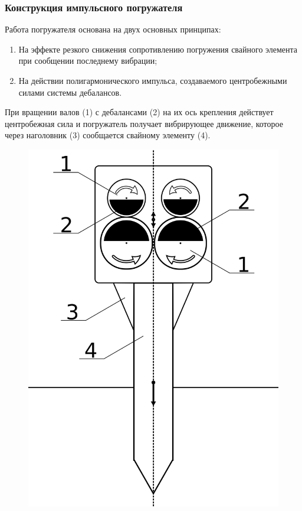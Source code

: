 \documentclass[10pt, pdf, hyperref={unicode}]{beamer}
\begin{document}
    \begin{frame}
        \frametitle{Конструкция импульсного погружателя}
        \begin{center}
            \begin{minipage}[h]{0.97\linewidth}
                \begin{minipage}[h]{0.55\linewidth}
                    Работа погружателя основана на двух основных принципах:
                    \begin{enumerate} 
                        \item На эффекте резкого снижения сопротивлению погружения свайного элемента при сообщении последнему вибрации;
                        \item На действии полигармонического импульса, создаваемого центробежными силами системы дебалансов.
                    \end{enumerate}
                    При вращении валов (1) с дебалансами (2) на их ось крепления действует центробежная сила и погружатель получает вибрирующее движение,
                    которое через наголовник (3) сообщается свайному элементу (4).
                \end{minipage}
                \hfill
                \begin{minipage}[h]{0.36\linewidth}
                    \begin{figure}[h]
                        \centering
                        \includegraphics[width=1\linewidth]{../img/scheme_porg_2.png}

\end{figure}
\end{minipage}
\end{minipage}
\end{center}
\end{frame}
\end{document}
